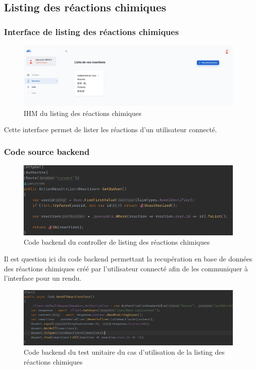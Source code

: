 \subsection{Listing des réactions chimiques}

\subsubsection{Interface de listing des réactions chimiques}

\begin{figure}[H]
	\centering
	\includegraphics[width=1\textwidth]{img/ilrc}
	\caption{IHM du listing des réactions chimiques}
\end{figure}

Cette interface permet de lister les réactions d'un utilisateur connecté.

\subsubsection{Code source backend}

\begin{figure}[H]
	\centering
	\includegraphics[width=1\textwidth]{img/clrea}
	\caption{Code backend du controller de listing des réactions chimiques}
\end{figure}

Il est question ici du code backend permettant la recupération en base de données des réactions chimiques créé par l'utilisateur connecté afin de les communiquer à l'interface pour un rendu.

\begin{figure}[H]
	\centering
	\includegraphics[width=1\textwidth]{img/utreaall}
	\caption{Code backend du test unitaire du cas d'utilisation de la listing des réactions chimiques}
\end{figure}

